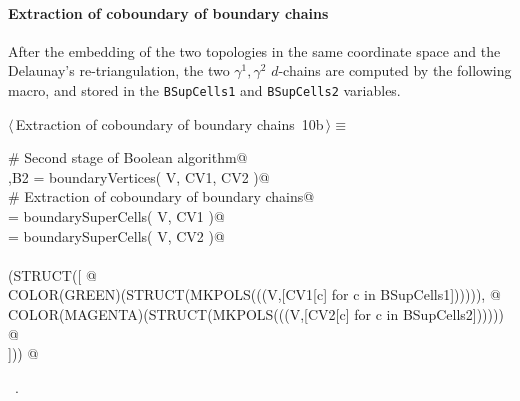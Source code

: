 \documentclass[11pt,oneside]{article}	%
\begin{document}
\paragraph{Extraction of coboundary of boundary chains}

After the embedding of the two topologies in the same coordinate space and the Delaunay's re-triangulation, the two $\gamma^1,\gamma^2$ $d$-chains are computed by the following macro, and stored in the \texttt{BSupCells1} and \texttt{BSupCells2} variables.

\begin{flushleft} \small \label{scrap17}
\protect{}$\langle\,$Extraction of coboundary of boundary chains\nobreak\ {\footnotesize 10b}$\,\rangle\equiv$
\vspace{-1ex}
\begin{list}{}{} \item
\mbox{}\verb@# Second stage of Boolean algorithm@\\
\mbox{},B2 = boundaryVertices( V, CV1, CV2 )@\\
\mbox{}\verb@# Extraction of coboundary of boundary chains@\\
\mbox{} = boundarySuperCells( V, CV1 )@\\
\mbox{} = boundarySuperCells( V, CV2 )@\\
\mbox{}\verb@@\\
\mbox{}\verb@VIEW(STRUCT([ @\\
\mbox{}\verb@   COLOR(GREEN)(STRUCT(MKPOLS(((V,[CV1[c] for c in BSupCells1]))))), @\\
\mbox{}\verb@   COLOR(MAGENTA)(STRUCT(MKPOLS(((V,[CV2[c] for c in BSupCells2]))))) @\\
\mbox{}\verb@])) @\\
\mbox{}\verb@@{\NWsep}
\end{list}
\vspace{-1ex}
\footnotesize\addtolength{\baselineskip}{-1ex}
\begin{list}{}{\setlength{\itemsep}{-\parsep}\setlength{\itemindent}{-\leftmargin}}
\item \NWtxtMacroRefIn\ .
\end{list}
\end{flushleft}
\end{document}
